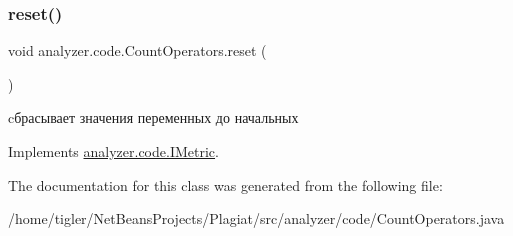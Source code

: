 \subsubsection{\texorpdfstring{reset()}{reset()}}
{\footnotesize\ttfamily void analyzer.\+code.\+Count\+Operators.\+reset (\begin{DoxyParamCaption}{ }\end{DoxyParamCaption})\hspace{0.3cm}{\ttfamily [inline]}}

cбрасывает значения переменных до начальных 

Implements \hyperlink{interfaceanalyzer_1_1code_1_1IMetric}{analyzer.\+code.\+I\+Metric}.



The documentation for this class was generated from the following file\+:\begin{DoxyCompactItemize}
\item 
/home/tigler/\+Net\+Beans\+Projects/\+Plagiat/src/analyzer/code/Count\+Operators.\+java\end{DoxyCompactItemize}
